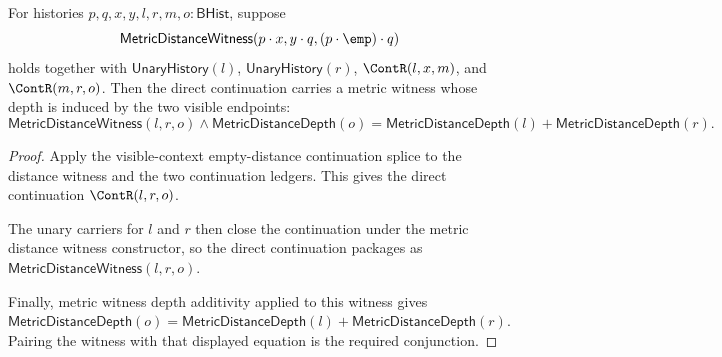 \begin{theorem}
\label{thm:metric-distance-witness-visible-context-empty-distance-continuation-witness-depth}
For histories $p,q,x,y,l,r,m,o:\mathsf{BHist}$, suppose
$$
\mathsf{MetricDistanceWitness}(p\cdot x,y\cdot q,(p\cdot\emp)\cdot q)
$$
holds together with $\mathsf{UnaryHistory}(l)$, $\mathsf{UnaryHistory}(r)$,
$\ContR(l,x,m)$, and $\ContR(m,r,o)$. Then the direct continuation carries a
metric witness whose depth is induced by the two visible endpoints:
$$
\mathsf{MetricDistanceWitness}(l,r,o)\wedge
\mathsf{MetricDistanceDepth}(o)=
\mathsf{MetricDistanceDepth}(l)+\mathsf{MetricDistanceDepth}(r).
$$
\end{theorem}
\begin{proof}
Apply the visible-context empty-distance continuation splice to the distance
witness and the two continuation ledgers. This gives the direct continuation
$\ContR(l,r,o)$.

The unary carriers for $l$ and $r$ then close the continuation under the metric
distance witness constructor, so the direct continuation packages as
$\mathsf{MetricDistanceWitness}(l,r,o)$.

Finally, metric witness depth additivity applied to this witness gives
$\mathsf{MetricDistanceDepth}(o)=
\mathsf{MetricDistanceDepth}(l)+\mathsf{MetricDistanceDepth}(r)$. Pairing the
witness with that displayed equation is the required conjunction.
\end{proof}

